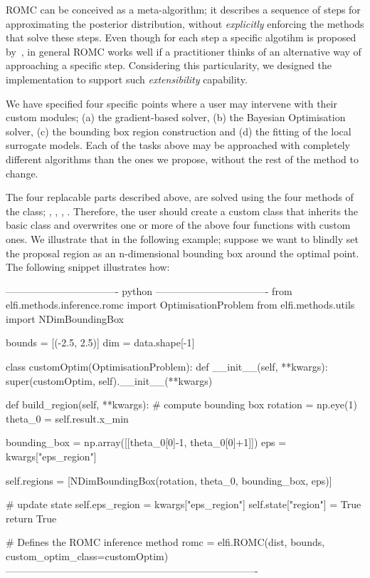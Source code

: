 ROMC can be conceived as a meta-algorithm; it describes a sequence of
steps for approximating the posterior distribution, without
\emph{explicitly} enforcing the methods that solve these steps. Even
though for each step a specific algotihm is proposed
by~\cite{Ikonomov2019}, in general ROMC works well if a practitioner
thinks of an alternative way of approaching a specific
step. Considering this particularity, we designed the implementation
to support such \emph{extensibility} capability.

We have specified four specific points where a user may intervene with
their custom modules; (a) the gradient-based solver, (b) the Bayesian
Optimisation solver, (c) the bounding box region construction and (d)
the fitting of the local surrogate models. Each of the tasks above may
be approached with completely different algorithms than the ones we
propose, without the rest of the method to change.

The four replacable parts described above, are solved using the four
methods of the \linebreak {} class;
, ,
\linebreak {},
. Therefore, the user should
create a custom class that inherits the basic
 class and overwrites one or more of the
above four functions with custom ones. We illustrate that in the
following example; suppose we want to blindly set the proposal region
as an n-dimensional bounding box around the optimal point. The
following snippet illustrates how:

\begin{Code}
---------------------------------- python ----------------------------------
from elfi.methods.inference.romc import OptimisationProblem
from elfi.methods.utils import NDimBoundingBox

bounds = [(-2.5, 2.5)]
dim = data.shape[-1]

class customOptim(OptimisationProblem):
    def __init__(self, **kwargs):
        super(customOptim, self).__init__(**kwargs)
        
    def build_region(self, **kwargs):
        # compute bounding box
        rotation = np.eye(1)
        theta_0 = self.result.x_min
        
        bounding_box = np.array([[theta_0[0]-1, theta_0[0]+1]])
        eps = kwargs["eps_region"]
        
        self.regions = [NDimBoundingBox(rotation, theta_0, bounding_box, eps)]
        
        # update state
        self.eps_region = kwargs["eps_region"]
        self.state["region"] = True
        return True

# Defines the ROMC inference method
romc = elfi.ROMC(dist, bounds, custom_optim_class=customOptim)
----------------------------------------------------------------------------    
\end{Code}

